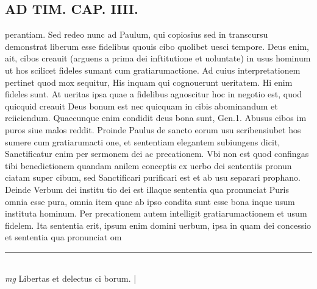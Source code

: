 \documentclass{article}
\begin{document}
\begin{pages}
\section*{AD TIM. CAP. IIII. }
\marginpar{[ p.140 ]}\pstart perantiam. Sed redeo nunc ad Paulum, qui copiosius sed in transcursu demonstrat liberum esse fidelibus quouis cibo quolibet uesci tempore. Deus enim, ait, cibos creauit (arguens a prima dei inftitutione et uoluntate) in usus hominum ut hos scilicet fideles sumant cum gratiarumactione. Ad cuius interpretationem pertinet quod mox sequitur, His inquam qui cognouerunt ueritatem. Hi enim fideles sunt. At ueritas ipsa quae a fidelibus agnoscitur hoc in negotio est, quod quicquid creauit Deus bonum est nec quicquam in cibis abominandum et reiiciendum. Quaecunque  enim condidit deus bona sunt, Gen.1. Abusus cibos im puros siue malos reddit. Proinde Paulus de sancto eorum usu scribensiubet hos sumere cum gratiarumacti one, et sententiam elegantem subiungens dicit, Sanctificatur enim per sermonem dei ac precationem. Vbi non est quod confingas tibi benedictionem quandam anilem conceptis ex uerbo dei sententiis pronun ciatam super cibum, sed Sanctificari purificari est et ab usu separari prophano. Deinde Verbum dei institu tio dei est illaque sententia qua pronunciat Puris omnia esse pura, omnia item quae ab ipso condita sunt esse bona inque usum instituta hominum. Per precationem autem intelligit gratiarumactionem et usum fidelem. Ita sententia erit, ipsum enim domini uerbum, ipsa in quam dei concessio et sententia qua pronunciat om\pend
\vspace{0.5cm}\noindent
\vspace{0.2cm}\rule{1cm}{0.2pt}\\ 
\hspace{0.2cm}\textit{mg}
\footnotesize Libertas et delectus ci borum. 
\normalsize| 

\end{pages}
\end{document}
